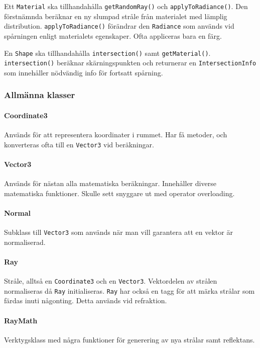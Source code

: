 \documentclass{article}
\begin{document}
Ett \texttt{Material} ska tillhandahålla \texttt{getRandomRay()} och
\texttt{applyToRadiance()}. Den förstnämnda beräknar en ny slumpad
stråle från materialet med lämplig
distribution. \texttt{applyToRadiance()} förändrar den
\texttt{Radiance} som används vid spårningen enligt materialets
egenskaper. Ofta appliceras bara en färg.

En \texttt{Shape} ska tillhandahålla \texttt{intersection()} samt
\texttt{getMaterial()}. \texttt{intersection()} beräknar
skärningspunkten och returnerar en \texttt{IntersectionInfo} som
innehåller nödvändig info för fortsatt spårning.

\subsubsection{Allmänna klasser}
\paragraph{Coordinate3}
Används för att representera koordinater i rummet. Har få metoder, och
konverteras ofta till en \texttt{Vector3} vid beräkningar.

\paragraph{Vector3}
Används för nästan alla matematiska beräkningar. Innehåller diverse
matematiska funktioner. Skulle sett snyggare ut med operator overloading.

\paragraph{Normal}
Subklass till \texttt{Vector3} som används när man vill garantera att
en vektor är normaliserad.

\paragraph{Ray}
Stråle, alltså en \texttt{Coordinate3} och en
\texttt{Vector3}. Vektordelen av strålen normaliseras då \texttt{Ray}
initialiseras. \texttt{Ray} har också en tagg för att märka strålar
som färdas inuti någonting. Detta används vid refraktion.

\paragraph{RayMath}
Verktygsklass med några funktioner för generering av nya strålar samt
reflektans.
\end{document}
